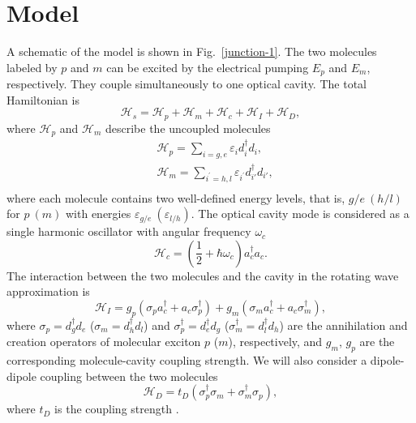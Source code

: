 \documentclass[aps,prb,
superscriptaddress,
,twocolumn
,floatfix,footinbib,longbibliography,
]{revtex4-2}
\begin{document}
\section{Model}
A schematic of the model is shown in Fig.~\ref{junction-1}.
The two molecules labeled by $p$ and $m$ can be excited by the electrical pumping $E_{p}$ and $E_{m}$, respectively.
They couple simultaneously to one optical cavity.
The total Hamiltonian is
\begin{equation}
\mathcal{H}_{s}=\mathcal{H}_{p}+\mathcal{H}_{m}+\mathcal{H}_{c}+\mathcal{H}_{I}+\mathcal{H}_{D},
\label{Hamiltonian}
\end{equation}
where $\mathcal{H}_{p}$ and $\mathcal{H}_{m}$ describe the uncoupled molecules
\begin{equation}
\begin{split}
&\mathcal{H}_{p}=\sum_{i=g,e}\varepsilon_{i}d_i^\dagger d_i,\\
&\mathcal{H}_{m}=\sum_{i^{\prime}=h,l}\varepsilon_{i^{\prime}}d_{i'}^\dagger d_{i'},\\
\end{split}
\end{equation}
where each molecule contains two well-defined energy levels, that is, $g/e~(h/l)$ for $p~(m)$ with energies $\varepsilon_{g/e}~(\varepsilon_{l/h})$.
The optical cavity mode is considered as  a single harmonic oscillator with angular frequency $\omega_{c}$
\begin{equation}
\mathcal{H}_{c}=\left(\frac{1}{2}+\hbar\omega_{c}\right)a^{\dag}_{c}a_{c}.
\end{equation}
The interaction between the two molecules and the cavity in the rotating wave approximation is
\begin{equation}
\mathcal{H}_{I}=g_{p}(\sigma_{p}a^{\dag}_{c}+a_{c}\sigma_{p}^{\dag})+g_{m}(\sigma_{m}a^{\dag}_{c}+a_{c}\sigma_{m}^{\dag}),
\end{equation}
where $\sigma_{p}=d_g^\dagger d_e$ ($\sigma_{m}=d_h^\dagger d_l$) and $\sigma_{p}^{\dag}=d_e^\dagger d_g$ ($\sigma_{m}^{\dag}=d_l^\dagger d_h$) are the annihilation and creation operators of molecular exciton $p$ ($m$), respectively, and $g_{m}$, $g_{p}$ are the corresponding molecule-cavity coupling strength.
We will also consider a dipole-dipole coupling between the two molecules
\begin{equation}
\mathcal{H}_{D}=t_{D}(\sigma_{p}^{\dagger}\sigma_{m}+\sigma_{m}^{\dagger}\sigma_{p}),
\end{equation}
where $t_{D}$ is the coupling strength \cite{vlaming2014tunable,zhang2016visualizing,PhysRevLett.122.233901}.
\end{document}
